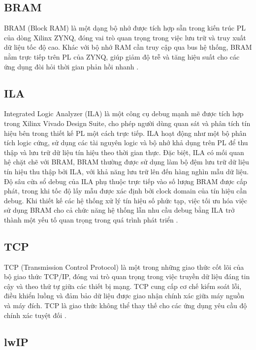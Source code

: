 \documentclass[../DoAn.tex]{subfiles}
\begin{document}
\subsection{BRAM}
BRAM (Block RAM) là một dạng bộ nhớ được tích hợp sẵn trong kiến trúc PL của dòng Xilinx ZYNQ, đóng vai trò quan trọng trong việc lưu trữ và truy xuất dữ liệu tốc độ cao. Khác với bộ nhớ RAM cần truy cập qua bus hệ thống, BRAM nằm trực tiếp trên PL của ZYNQ, giúp giảm độ trễ và tăng hiệu suất cho các ứng dụng đòi hỏi thời gian phản hồi nhanh \cite{russell_what_2022}.

\subsection{ILA}
Integrated Logic Analyzer (ILA) là một công cụ debug mạnh mẽ được tích hợp trong Xilinx Vivado Design Suite, cho phép người dùng quan sát và phân tích tín hiệu bên trong thiết kế PL một cách trực tiếp. ILA hoạt động như một bộ phân tích logic cứng, sử dụng các tài nguyên logic và bộ nhớ khả dụng trên PL để thu thập và lưu trữ dữ liệu tín hiệu theo thời gian thực. Đặc biệt, ILA có mối quan hệ chặt chẽ với BRAM, BRAM thường được sử dụng làm bộ đệm lưu trữ dữ liệu tín hiệu thu thập bởi ILA, với khả năng lưu trữ lên đến hàng nghìn mẫu dữ liệu. Độ sâu cửa sổ debug của ILA phụ thuộc trực tiếp vào số lượng BRAM được cấp phát, trong khi tốc độ lấy mẫu được xác định bởi clock domain của tín hiệu cần debug. Khi thiết kế các hệ thống xử lý tín hiệu số phức tạp, việc tối ưu hóa việc sử dụng BRAM cho cả chức năng hệ thống lẫn nhu cầu debug bằng ILA trở thành một yếu tố quan trọng trong quá trình phát triển \cite{noauthor_integrated_nodate}.

\subsection{TCP}

TCP (Transmission Control Protocol) là một trong những giao thức cốt lõi của bộ giao thức TCP/IP, đóng vai trò quan trọng trong việc truyền dữ liệu đáng tin cậy và theo thứ tự giữa các thiết bị mạng. TCP cung cấp cơ chế kiểm soát lỗi, điều khiển luồng và đảm bảo dữ liệu được giao nhận chính xác giữa máy nguồn và máy đích. TCP là giao thức không thể thay thế cho các ứng dụng yêu cầu độ chính xác tuyệt đối \cite{noauthor_what_nodate}.

\subsection{lwIP}
\end{document}
